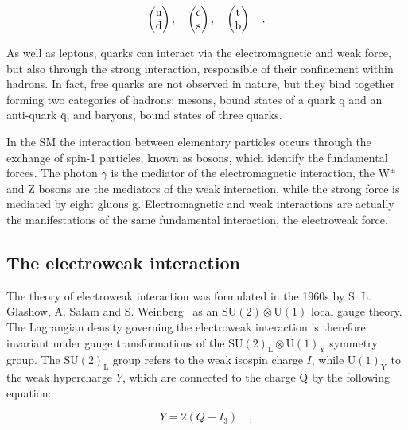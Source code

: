 \begin{equation}
\label{eq:quarks}
\begin{pmatrix} \rm u       \\ \rm d      \end{pmatrix}, \quad
\begin{pmatrix} \rm c       \\ \rm s      \end{pmatrix}, \quad
\begin{pmatrix} \rm t       \\ \rm b      \end{pmatrix}  \quad .
\end{equation}

As well as leptons, quarks can interact via the electromagnetic and weak force, but also through the strong interaction, responsible of their confinement within hadrons. In fact, free quarks are not observed in nature, but they bind together forming two categories of hadrons: mesons, bound states of a quark q and an anti-quark $\mathrm{\bar{q}}$, and baryons, bound states of three quarks.

In the SM the interaction between elementary particles occurs through the exchange of spin-1 particles, known as bosons, which identify the fundamental forces. The photon $\gamma$ is the mediator of the electromagnetic interaction, the $\mathrm{W^{\pm}}$ and Z bosons are the mediators of the weak interaction, while the strong force is mediated by eight gluons g. Electromagnetic and weak interactions are actually the manifestations of the same fundamental interaction, the electroweak force.


\subsection{The electroweak interaction}

The theory of electroweak interaction was formulated in the 1960s by S. L. Glashow, A. Salam and S. Weinberg~\cite{Glashow:1961tr,Weinberg:1967tq} as an $\mathrm{SU(2) \otimes U(1)}$ local gauge theory.
The Lagrangian density governing the electroweak interaction is therefore invariant under gauge transformations of the $\mathrm{SU(2)_L\otimes U(1)_Y}$ symmetry group. The $\mathrm{SU(2)_L}$ group refers to the weak isospin charge $I$, while $\mathrm{U(1)_Y}$ to the weak hypercharge $Y$, which are connected to the charge Q by the following equation:

\begin{equation}
Y = 2(Q - I_3) \quad,
\end{equation}

